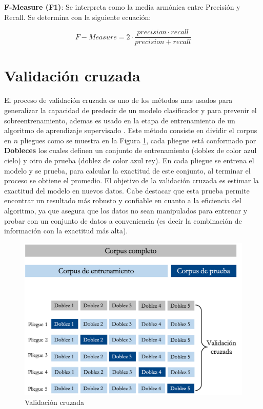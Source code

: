 \textbf{F-Measure (F1)}: Se interpreta como la media armónica entre Precisión y Recall. Se determina
con la siguiente ecuación:

\begin{equation}\label{eq:3}
	 F-Measure = 2 \cdot \frac{precision \cdot recall}{precision+recall}
\end{equation}


\section{Validación cruzada}

El proceso de validación cruzada es uno de los métodos mas usados para generalizar la capacidad de predecir de un modelo clasificador y para prevenir el sobre\-entrenamiento, ademas es usado en la etapa de entrenamiento de un algoritmo de aprendizaje supervisado \citep{CTValidacionC}. Este método consiste en dividir el corpus en $n$ pliegues como se muestra en la Figura \ref{cp3:diagramacv}, cada pliegue está conformado por \textbf{Dobleces} los cuales definen un conjunto de entrenamiento (doblez de color azul cielo) y otro de prueba (doblez de color azul rey). En cada pliegue se entrena el modelo y se prueba, para calcular la exactitud de este conjunto, al terminar el proceso se obtiene el promedio. El objetivo de la validación cruzada es estimar la exactitud del modelo en nuevos datos. Cabe destacar que esta prueba permite encontrar un resultado más robusto y confiable en cuanto a la eficiencia del algoritmo, ya que asegura que los datos no sean manipulados para entrenar y probar con un conjunto de datos a conveniencia (es decir la combinación de información con la exactitud más alta).


\begin{figure}[h]
\centering
\includegraphics[scale=.55]{imagenes/Capitulo3/validacionc.png}
\caption{Validación cruzada}
\label{cp3:diagramacv}
\end{figure}

